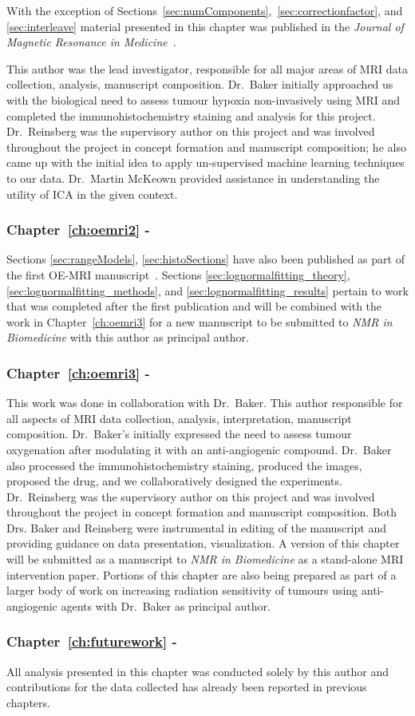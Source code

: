 With the exception of Sections~\ref{sec:numComponents},~\ref{sec:correctionfactor}, and \ref{sec:interleave} material presented in this chapter was published in the \textit{Journal of Magnetic Resonance in Medicine}~\cite{Moosvi:2018ca}. 

This author was the lead investigator, responsible for all major areas of MRI data collection, analysis, manuscript composition. 
Dr.\ Baker initially approached us with the biological need to assess tumour hypoxia non-invasively using MRI and completed the immunohistochemistry staining and analysis for this project. 
Dr.\ Reinsberg was the supervisory author on this project and was involved throughout the project in concept formation and manuscript composition; he also came up with the initial idea to apply un-supervised machine learning techniques to our data. 
Dr.\ Martin McKeown provided assistance in understanding the utility of \acs{ICA} in the given context. 

\subsubsection{Chapter~\ref{ch:oemri2} - }
Sections \ref{sec:rangeModels}, \ref{sec:histoSections} have also been published as part of the first OE-MRI manuscript~\cite{Moosvi:2018ca}.
Sections \ref{sec:lognormalfitting_theory}, \ref{sec:lognormalfitting_methods}, and \ref{sec:lognormalfitting_results} pertain to work that was completed after the first publication and will be combined with the work in Chapter~\ref{ch:oemri3} for a new manuscript to be submitted to \textit{NMR in Biomedicine} with this author as principal author.

\subsubsection{Chapter~\ref{ch:oemri3} - }

This work was done in collaboration with Dr.\ Baker.
This author responsible for all aspects of MRI data collection, analysis, interpretation, manuscript composition. 
Dr.\ Baker's initially expressed the need to assess tumour oxygenation after modulating it with an anti-angiogenic compound.
Dr.\ Baker also processed the immunohistochemistry staining, produced the images, proposed the drug, and we collaboratively designed the experiments. 
Dr.\ Reinsberg was the supervisory author on this project and was involved throughout the project in concept formation and manuscript composition. 
Both Drs. Baker and Reinsberg were instrumental in editing of the manuscript and providing guidance on data presentation, visualization.
A version of this chapter will be submitted as a manuscript to \textit{NMR in Biomedicine} as a stand-alone MRI intervention paper.
Portions of this chapter are also being prepared as part of a larger body of work on increasing radiation sensitivity of tumours using anti-angiogenic agents with Dr.\ Baker as principal author.

\subsubsection{Chapter~\ref{ch:futurework} - }

All analysis presented in this chapter was conducted solely by this author and contributions for the data collected has already been reported in previous chapters.
